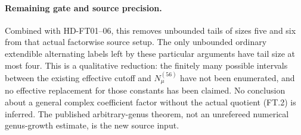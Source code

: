 \paragraph{Remaining gate and source precision.}
Combined with HD-FT01--06, this removes unbounded tails of sizes
five and six from that actual factorwise source setup.  The only
unbounded ordinary extendible alternating labels left by these
particular arguments have tail size at most four.
This is a qualitative reduction: the finitely many possible intervals
between the existing effective cutoff and \(N_\mu^{(56)}\) have
not been enumerated, and no effective replacement for those constants
has been claimed.  No conclusion about a general complex coefficient
factor without the actual quotient (FT.2) is inferred.
The published arbitrary-genus theorem, not an unrefereed numerical
genus-growth estimate, is the new source input.
